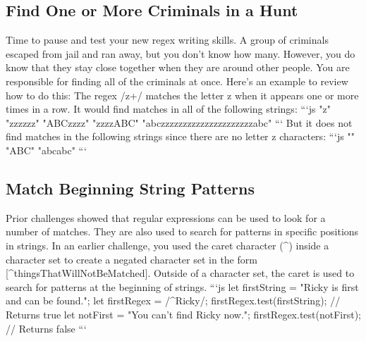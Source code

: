 \documentclass{article}%
\begin{document}
%
\subsection{Find One or More Criminals in a Hunt}%
\label{subsec:FindOneorMoreCriminalsinaHunt}%
Time to pause and test your new regex writing skills. A group of criminals escaped from jail and ran away, but you don't know how many. However, you do know that they stay close together when they are around other people. You are responsible for finding all of the criminals at once.\newline%
Here's an example to review how to do this:\newline%
The regex /z+/ matches the letter z when it appears one or more times in a row. It would find matches in all of the following strings:\newline%
```js\newline%
"z"\newline%
"zzzzzz"\newline%
"ABCzzzz"\newline%
"zzzzABC"\newline%
"abczzzzzzzzzzzzzzzzzzzzzabc"\newline%
```\newline%
But it does not find matches in the following strings since there are no letter z characters:\newline%
```js\newline%
""\newline%
"ABC"\newline%
"abcabc"\newline%
```\newline%

%
\subsection{Match Beginning String Patterns}%
\label{subsec:MatchBeginningStringPatterns}%
Prior challenges showed that regular expressions can be used to look for a number of matches. They are also used to search for patterns in specific positions in strings.\newline%
In an earlier challenge, you used the caret character (\^{}) inside a character set to create a negated character set in the form {[}\^{}thingsThatWillNotBeMatched{]}. Outside of a character set, the caret is used to search for patterns at the beginning of strings.\newline%
```js\newline%
let firstString = "Ricky is first and can be found.";\newline%
let firstRegex = /\^{}Ricky/;\newline%
firstRegex.test(firstString);\newline%
// Returns true\newline%
let notFirst = "You can't find Ricky now.";\newline%
firstRegex.test(notFirst);\newline%
// Returns false\newline%
```\newline%
\end{document}
